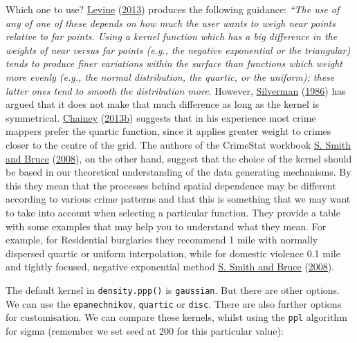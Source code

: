 \documentclass[
  krantz2]{krantz}
\begin{document}
Which one to use? \protect\hyperlink{ref-Levine_2013}{Levine} (\protect\hyperlink{ref-Levine_2013}{2013}) produces the following guidance: \emph{``The use of any of one of these depends on how much the user wants to weigh near points relative to far points. Using a kernel function which has a big difference in the weights of near versus far points (e.g., the negative exponential or the triangular) tends to produce finer variations within the surface than functions which weight more evenly (e.g., the normal distribution, the quartic, or the uniform); these latter ones tend to smooth the distribution more}. However, \protect\hyperlink{ref-Silverman_1986}{Silverman} (\protect\hyperlink{ref-Silverman_1986}{1986}) has argued that it does not make that much difference as long as the kernel is symmetrical. \protect\hyperlink{ref-Chainey_2013b}{Chainey} (\protect\hyperlink{ref-Chainey_2013b}{2013b}) suggests that in his experience most crime mappers prefer the quartic function, since it applies greater weight to crimes closer to the centre of the grid. The authors of the CrimeStat workbook \protect\hyperlink{ref-Smith_2008}{S. Smith and Bruce} (\protect\hyperlink{ref-Smith_2008}{2008}), on the other hand, suggest that the choice of the kernel should be based in our theoretical understanding of the data generating mechanisms. By this they mean that the processes behind spatial dependence may be different according to various crime patterns and that this is something that we may want to take into account when selecting a particular function. They provide a table with some examples that may help you to understand what they mean. For example, for Residential burglaries they recommend 1 mile with normally dispersed quartic or uniform interpolation, while for domestic violence 0.1 mile and tightly focused, negative exponential method \protect\hyperlink{ref-Smith_2008}{S. Smith and Bruce} (\protect\hyperlink{ref-Smith_2008}{2008}).

The default kernel in \texttt{density.ppp()} is \texttt{gaussian}. But there are other options. We can use the \texttt{epanechnikov}, \texttt{quartic} or \texttt{disc}. There are also further options for customisation. We can compare these kernels, whilst using the \texttt{ppl} algorithm for sigma (remember we set seed at 200 for this particular value):
\end{document}
